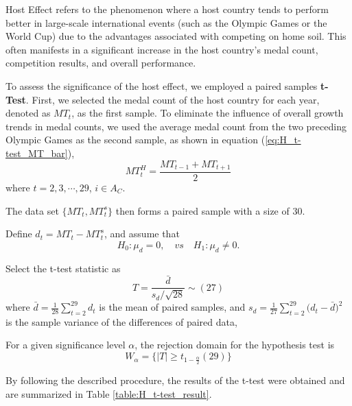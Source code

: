 \documentclass{mcmthesis}
\begin{document}
	Host Effect refers to the phenomenon where a host country tends to perform better in large-scale international events (such as the Olympic Games or the World Cup) due to the advantages associated with competing on home soil. This often manifests in a significant increase in the host country's medal count, competition results, and overall performance.
	
	
	To assess the significance of the host effect, we employed a paired samples  \textbf{t-Test}. First, we selected the medal count of the host country for each year, denoted as $MT_{t}$, as the first sample. To eliminate the influence of overall growth trends in medal counts, we used the average medal count from the two preceding Olympic Games as the second sample, as shown in equation (\ref{eq:H_t-test_MT_bar}),
	\begin{equation}
		MT^H_{t}=\frac{ MT_{t-1} + MT_{t+1} }{2}
		\label{eq:H_t-test_MT_bar}
	\end{equation}
	where $t=2,3,\cdots,29$, $i\in A_{C}$. 
	
	The data set $\{MT_{t},MT^s_{t}\}$ then forms a paired sample with a size of 30. 
	
	Define $d_t= MT_{t} - MT^s_{t}$, and assume that
	\begin{equation*}
		H_0: \mu_d=0, \quad vs \quad H_1:  \mu_d \ne 0.
	\end{equation*}
	
	Select the t-test statistic as
	\begin{equation}
		T=\frac{ \bar{d} }{ s_d\slash \sqrt{28} } \sim (27)
	\end{equation}
	where $\bar{d}=\frac{1}{28} \sum_{t=2}^{29} d_t$ is the mean of paired samples, 
	and $ s_d = \frac{1}{27} \sum_{t=2}^{29}\big( d_t - \bar{d} \big)^2 $ is the sample variance of the differences of paired data, 
	
	For a given significance level $\alpha$, the rejection domain for the hypothesis test is
	\begin{equation}
		W_\alpha = \big\{ |T| \ge t_{1-\frac{\alpha}{2}}(29) \big\}
	\end{equation}
	
	By following the described procedure, the results of the t-test were obtained and are summarized in Table \ref{table:H_t-test_result}.
	
\end{document}
